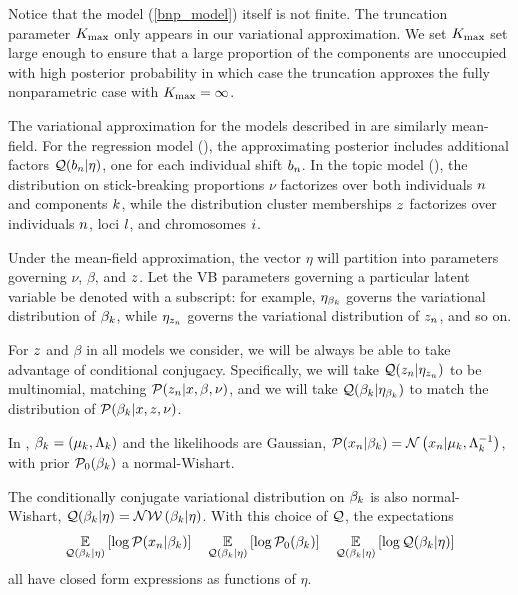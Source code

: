 Notice that the model (\eqref{bnp_model}) itself is not finite. The truncation
parameter ${K_{\mathrm{max}}}$ only appears in our variational approximation.
We set ${K_{\mathrm{max}}}$ set large enough to ensure that a large
proportion of the components are unoccupied with high posterior probability
in which case the truncation approxes the fully nonparametric case with ${K_{\mathrm{max}}} = \infty$.

The variational approximation for the models described in 
are similarly mean-field. For the regression model (),
the approximating posterior
includes additional factors $\mathcal{Q}(b_n\vert\eta)$, one for each individual shift $b_n$.
In the topic model (), the distribution on stick-breaking proportions $\nu$
factorizes over
both individuals $n$ and components $k$, while the distribution
cluster memberships $z$
factorizes over individuals $n$, loci $l$, and chromosomes $i$.

Under the mean-field approximation,
the vector $\eta$ will partition into parameters
governing $\nu$, $\beta$, and $z$.
Let the VB parameters governing a
particular latent variable be denoted with a subscript: for example,
$\eta_{\beta_k}$ governs the variational distribution of $\beta_{k}$,
while $\eta_{z_n}$ governs the variational distribution of $z_n$, and so on.

For $z$ and $\beta$ in all models we consider, we will be always be able to
take advantage of conditional conjugacy. Specifically, we will take $\mathcal{Q}(z_{n}
\vert \eta_{z_n})$ to be multinomial, matching $\mathcal{P}(z_{n}
\vert x, \beta, \nu)$, and we will take $\mathcal{Q}(\beta_k \vert \eta_{\beta_k})$
to match the distribution of $\mathcal{P}(\beta_{k} \vert x, z, \nu)$.



\begin{ex}
%
In , $\beta_k = (\mu_k, \Lambda_k)$ and the likelihoods are Gaussian,
$\mathcal{P}(x_n \vert \beta_k) = \mathcal{N}\left(x_n \vert \mu_k, \Lambda_k^{-1}\right)$,
with prior $\mathcal{P}_{0}(\beta_k)$ a normal-Wishart.

The conditionally conjugate variational distribution on $\beta_k$ is
also normal-Wishart, $\mathcal{Q}(\beta_k \vert \eta) = \mathcal{N}\mathcal{W}\left(\beta_k \vert \eta\right)$. With this choice of $\mathcal{Q}$,
the expectations
\begin{align*}
\underset{\mathcal{Q}(\beta_k \vert \eta)}{\mathbb{E}}\left[\log \mathcal{P}(x_n \vert \beta_k)\right] \quad
\underset{\mathcal{Q}(\beta_k \vert \eta)}{\mathbb{E}}\left[\log \mathcal{P}_{0}(\beta_k)\right] \quad
\underset{\mathcal{Q}(\beta_k \vert \eta)}{\mathbb{E}}\left[\log \mathcal{Q}(\beta_k \vert \eta)\right]
\end{align*}
all have closed form expressions as functions of $\eta$.

\end{ex}

